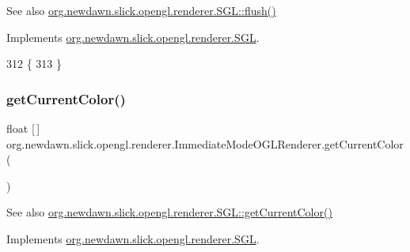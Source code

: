 \begin{DoxySeeAlso}{See also}
\mbox{\hyperlink{interfaceorg_1_1newdawn_1_1slick_1_1opengl_1_1renderer_1_1_s_g_l_a97c40969d74b57d2df86421d53b9c55c}{org.\+newdawn.\+slick.\+opengl.\+renderer.\+S\+G\+L\+::flush()}} 
\end{DoxySeeAlso}


Implements \mbox{\hyperlink{interfaceorg_1_1newdawn_1_1slick_1_1opengl_1_1renderer_1_1_s_g_l_a97c40969d74b57d2df86421d53b9c55c}{org.\+newdawn.\+slick.\+opengl.\+renderer.\+S\+GL}}.


\begin{DoxyCode}
312                         \{
313     \}
\end{DoxyCode}
\mbox{\label{classorg_1_1newdawn_1_1slick_1_1opengl_1_1renderer_1_1_immediate_mode_o_g_l_renderer_ad17f021212377ce528f3aa5fb6326e40}} 
\subsubsection{\texorpdfstring{get\+Current\+Color()}{getCurrentColor()}}
{\footnotesize\ttfamily float \mbox{[}$\,$\mbox{]} org.\+newdawn.\+slick.\+opengl.\+renderer.\+Immediate\+Mode\+O\+G\+L\+Renderer.\+get\+Current\+Color (\begin{DoxyParamCaption}{ }\end{DoxyParamCaption})\hspace{0.3cm}{\ttfamily [inline]}}

\begin{DoxySeeAlso}{See also}
\mbox{\hyperlink{interfaceorg_1_1newdawn_1_1slick_1_1opengl_1_1renderer_1_1_s_g_l_a212dd49f0deb91e38d917b5702704863}{org.\+newdawn.\+slick.\+opengl.\+renderer.\+S\+G\+L\+::get\+Current\+Color()}} 
\end{DoxySeeAlso}


Implements \mbox{\hyperlink{interfaceorg_1_1newdawn_1_1slick_1_1opengl_1_1renderer_1_1_s_g_l_a212dd49f0deb91e38d917b5702704863}{org.\+newdawn.\+slick.\+opengl.\+renderer.\+S\+GL}}.


